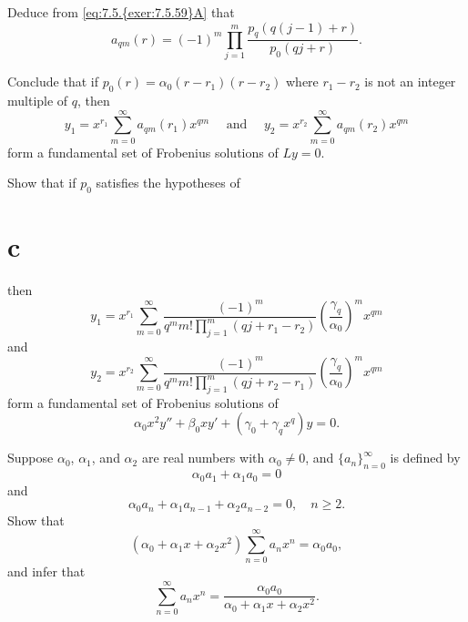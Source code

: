 \begin{exerciselist}
\begin{alist}
    \item %
    Deduce from \eqref{eq:7.5.{exer:7.5.59}A} that
    \[
      a_{qm}(r)=(-1)^{m}\prod_{j=1}^{m}\frac{p_{q}\left(q(j-1)+r\right)}{p_{0}(qj+r)}.
    \]

    \item %
    Conclude that if $p_{0}(r)=\alpha_{0}(r-r_{1})(r-r_{2})$ where $r_{1}-r_{2}$ is not an integer
    multiple of $q$, then
    \[
      y_{1}=x^{r_{1}}\sum_{m=0}^{\infty}a_{qm}(r_{1})x^{qm}\quad\mbox{ and }\quad y_{2}=x^{r_{2}}\sum_{m=0}^{\infty}a_{qm}(r_{2})x^{qm}
    \]
    form a fundamental set of Frobenius solutions of $Ly=0$.

    \item %
    Show that if $p_{0}$ satisfies the hypotheses of \part{c} then
    \[
      y_{1}=x^{r_{1}}\sum_{m=0}^{\infty}\frac{(-1)^{m}}{q^{m}m!\prod_{j=1}^{m}(qj+r_{1}-r_{2})}\left(\frac{\gamma_{q}}{\alpha_{0}}\right)^{m}x^{qm}
    \]
    and
    \[
      y_{2}=x^{r_{2}}\sum_{m=0}^{\infty}\frac{(-1)^{m}}{q^{m}m!\prod_{j=1}^{m}(qj+r_{2}-r_{1})}\left(\frac{\gamma_{q}}{\alpha_{0}}\right)^{m}x^{qm}
    \]
    form a fundamental set of Frobenius solutions of
    \[
      \alpha_{0}x^{2}y''+\beta_{0}xy'+(\gamma_{0}+\gamma_{q}x^{q})y=0.
    \]
  \end{alist}

  \item\label{exer:7.5.60}
  \begin{alist}
    \item %
    Suppose $\alpha_{0}$, $\alpha_{1}$, and $\alpha_{2}$ are real numbers with $\alpha_{0}\ne0$, and
    $\{a_{n}\}_{n=0}^{\infty}$ is defined by
    \[
      \alpha_{0}a_{1}+\alpha_{1}a_{0}=0
    \]
    and
    \[
      \alpha_{0}a_{n}+\alpha_{1}a_{n-1}+\alpha_{2}a_{n-2}=0,\quad n\ge2.
    \]
    Show that
    \[
      (\alpha_{0}+\alpha_{1}x+\alpha_{2}x^{2})\sum_{n=0}^{\infty}a_{n}x^{n}=\alpha_{0}a_{0},
    \]
    and infer that
    \[
      \sum_{n=0}^{\infty}a_{n}x^{n}=\frac{\alpha_{0}a_{0}}{\alpha_{0}+\alpha_{1}x+\alpha_{2}x^{2}}.
    \]


\end{alist}
\end{exerciselist}
